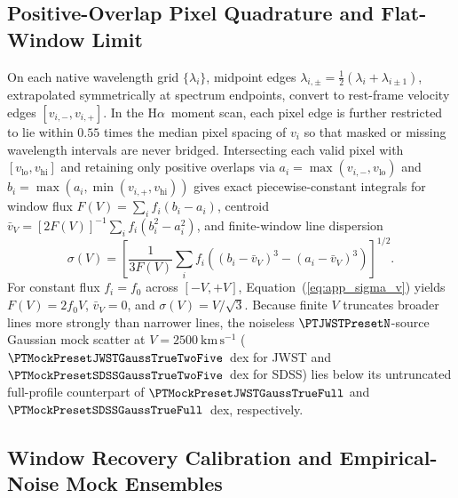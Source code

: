 \documentclass[twocolumn]{aastex631}
\newcommand{\Ha}{\ensuremath{\mathrm{H}\alpha}}
\newcommand{\kms}{\ensuremath{\mathrm{km\,s^{-1}}}}
\newcommand{\sigV}{\ensuremath{\sigma(V)}}
\begin{document}
\subsection{Positive-Overlap Pixel Quadrature and Flat-Window Limit}
\label{app:exact_int}

On each native wavelength grid $\{\lambda_i\}$, midpoint edges $\lambda_{i,\pm} = \tfrac{1}{2}(\lambda_i + \lambda_{i\pm 1})$, extrapolated symmetrically at spectrum endpoints, convert to rest-frame velocity edges $[v_{i,-}, v_{i,+}]$. In the \Ha\ moment scan, each pixel edge is further restricted to lie within $0.55$ times the median pixel spacing of $v_i$ so that masked or missing wavelength intervals are never bridged. Intersecting each valid pixel with $[v_{\mathrm{lo}}, v_{\mathrm{hi}}]$ and retaining only positive overlaps via $a_i = \max(v_{i,-}, v_{\mathrm{lo}})$ and $b_i = \max(a_i, \min(v_{i,+}, v_{\mathrm{hi}}))$ gives exact piecewise-constant integrals for window flux $F(V) = \sum_i f_i (b_i - a_i)$, centroid $\bar{v}_V = [2 F(V)]^{-1}\sum_i f_i (b_i^2 - a_i^2)$, and finite-window line dispersion
\begin{equation}
\sigV = \left[ \frac{1}{3 F(V)} \sum_i f_i \left( (b_i - \bar{v}_V)^3 - (a_i - \bar{v}_V)^3 \right) \right]^{1/2}.
\label{eq:app_sigma_v}
\end{equation}
For constant flux $f_i = f_0$ across $[-V, +V]$, Equation~(\ref{eq:app_sigma_v}) yields $F(V) = 2 f_0 V$, $\bar{v}_V = 0$, and $\sigV = V/\sqrt{3}$. Because finite $V$ truncates broader lines more strongly than narrower lines, the noiseless $\PTJWSTPresetN$-source Gaussian mock scatter at $V = 2500~\kms$ ($\PTMockPresetJWSTGaussTrueTwoFive$~dex for JWST and $\PTMockPresetSDSSGaussTrueTwoFive$~dex for SDSS) lies below its untruncated full-profile counterpart of $\PTMockPresetJWSTGaussTrueFull$ and $\PTMockPresetSDSSGaussTrueFull$~dex, respectively.

\subsection{Window Recovery Calibration and Empirical-Noise Mock Ensembles}
\label{app:injections}
\end{document}
